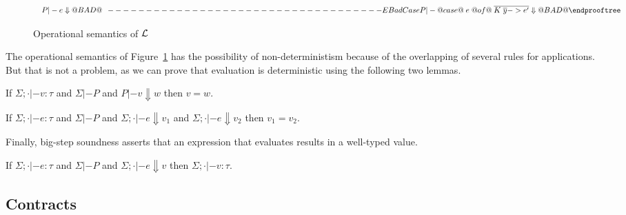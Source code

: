 \begin{figure}
\[\begin{array}{c}
\begin{array}{c}
P |- e \Downarrow @BAD@ \\
\end{array}
------------------------------------{EBadCase}
P |- @case@\;e\;@of@\;\ol{K\;\ol{y} -> e'} \Downarrow @BAD@
\endprooftree
\end{array}\]
\caption{Operational semantics of $\cal L$}\label{fig:opsem}
\end{figure}
The operational semantics of Figure~\ref{fig:opsem} has the possibility of non-deterministism because
of the overlapping of several rules for applications. But that is not a problem, as we can prove that evaluation 
is deterministic using the following two lemmas.
\begin{lemma}
If $\Sigma;\cdot |- v : \tau$ and 
$\Sigma |- P$ and $P |- v \Downarrow w$ then $ v = w $.
\end{lemma}
\begin{lemma}
If $\Sigma;\cdot |- e : \tau$ and 
$\Sigma |- P$ and $\Sigma;\cdot |- e \Downarrow v_1$ and $\Sigma;\cdot |- e \Downarrow v_2$ then
$v_1 = v_2$.
\end{lemma}
Finally, big-step soundness asserts that an expression that evaluates results in a
well-typed value.
\begin{lemma}
If $\Sigma;\cdot |- e : \tau$ and 
$\Sigma |- P$ and $\Sigma;\cdot |- e \Downarrow v$ then $\Sigma;\cdot |- v : \tau$.
\end{lemma}

\subsection{Contracts}

